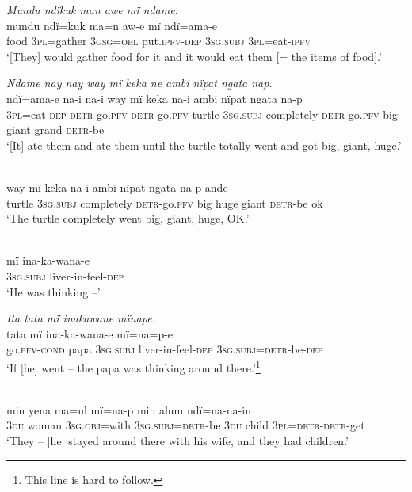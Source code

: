 \ex \negmedspace \textit{Mundu ndïkuk man a}{\textit{w}}\textit{e mï ndame.}\\
\gll mundu  ndï{=}kuk    ma{=}n    a{w-}e      mï      ndï={a}ma-e\\
food  3\textsc{pl}=gather  3\textsc{gsg}=\textsc{obl}  put.\textsc{ipfv-dep}  \textsc{3sg.subj}  3\textsc{pl}=eat-\textsc{ipfv}\\
\glt ‘[They] would gather food for it and it would eat them [= the items of food].’

\ex \negmedspace \textit{Ndame nay nay way mï keka ne ambi nïpat nga}{\textit{t}}\textit{a nap.}\\
\gll ndï={a}ma-e    na{{}-i} na{{}-i} way  mï      keka      n{a-i} ambi  nïpat  nga{t}a na{{}-}p\\
3\textsc{pl}=eat-\textsc{dep}  \textsc{detr-}go.\textsc{pfv}  \textsc{detr}{}-go.\textsc{pfv} turtle  3\textsc{sg.subj}  completely  \textsc{detr-}go.\textsc{pfv}  big    giant  grand \textsc{detr-}{be}\\
\glt ‘[It] ate them and ate them until {the turtle} totally went {and} got big, giant, huge.’

\ex {}\\
\gll way  mï      keka       na-i      ambi  nïpat  ngata na-p    ande\\
turtle  3\textsc{sg.subj}  completely  \textsc{detr-}go.\textsc{pfv}  big    huge  giant \textsc{detr-}be  ok\\
\glt ‘The turtle completely went big, giant, huge, OK.’

\ex {}\\
\gll mï      {i}na-ka-wana-e\\
3\textsc{sg.subj}  liver-in-feel-\textsc{dep}\\
\glt ‘He was thinking --’

\ex \negmedspace \textit{Ita tata mï inakawan}{\textit{e}} \textit{m}{\textit{ï}}\textit{nape.}\\
 tata    mï       ina-ka-wana-e m{ï=}na{=}p{{}-}e\\
go\textsc{.pfv-cond}  papa  3\textsc{sg.subj}  liver-in-feel-\textsc{dep}  3\textsc{sg.subj=detr}{}-be-\textsc{dep}\\
\glt ‘If [he] went -- the papa was thinking{ around there.}’\footnote{This line is hard to follow.}

\ex {}\\
\gll min  yena    m{a=u}l      m{ï=}na{{}-}p        min  alum ndï{=}na{{}-}n{a-in}\\
3\textsc{du}  woman    3\textsc{sg.obj}=with  \textsc{3sg.subj}=\textsc{detr-}be  3\textsc{du}  child {3\textsc{pl=detr-detr-}get}\\
\glt ‘They -- [he] stayed around there with his wife, and they had children.’

